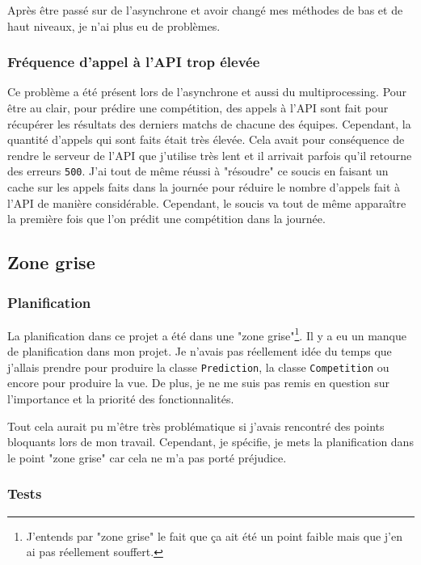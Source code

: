 \documentclass[a4paper,14pt]{extarticle}
\begin{document}
{Après être passé sur de l'asynchrone et avoir changé mes méthodes de bas et de haut niveaux, je n'ai plus eu de problèmes.

\subsubsection{Fréquence d'appel à l'API trop élevée}
Ce problème a été présent lors de l'asynchrone et aussi du multiprocessing. Pour être au clair, pour prédire une compétition, des appels à l'API sont fait pour récupérer les résultats des derniers matchs de chacune des équipes. Cependant, la quantité d'appels qui sont faits était très élevée. Cela avait pour conséquence de rendre le serveur de l'API que j'utilise très lent et il arrivait parfois qu'il retourne des erreurs \texttt{500}. J'ai tout de même réussi à "résoudre" ce soucis en faisant un cache sur les appels faits dans la journée pour réduire le nombre d'appels fait à l'API de manière considérable. Cependant, le soucis va tout de même apparaître la première fois que l'on prédit une compétition dans la journée.

\subsection{Zone grise}

\subsubsection{Planification}

La planification dans ce projet a été dans une "zone grise"\footnote{J'entends par "zone grise" le fait que ça ait été un point faible mais que j'en ai pas réellement souffert.}. Il y a eu un manque de planification dans mon projet. Je n'avais pas réellement idée du temps que j'allais prendre pour produire la classe \texttt{Prediction}, la classe \texttt{Competition} ou encore pour produire la vue. De plus, je ne me suis pas remis en question sur l'importance et la priorité des fonctionnalités.

Tout cela aurait pu m'être très problématique si j'avais rencontré des points bloquants lors de mon travail. Cependant, je spécifie, je mets la planification dans le point "zone grise" car cela ne m'a pas porté préjudice.

\subsubsection{Tests}

}
\end{document}
